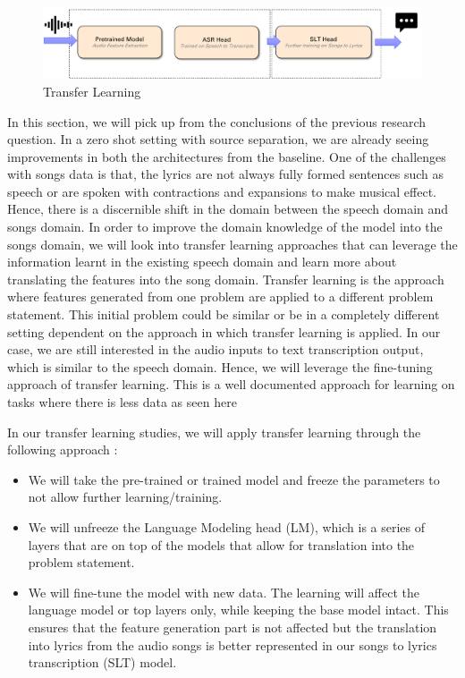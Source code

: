     \begin{figure} [H]
    \centering
    \includegraphics[width=1.0\textwidth]{05-research study/figures/transferlearning.pdf}
    \caption{Transfer Learning}
    \label{fig:transferlearning}
\end{figure}

In this section, we will pick up from the conclusions of the previous research question. In a zero shot setting with source separation, we are already seeing improvements in both the architectures from the baseline. One of the challenges with songs data is that, the lyrics are not always fully formed sentences such as speech or are spoken with contractions and expansions to make musical effect. Hence, there is a discernible shift in the domain between the speech domain and songs domain. In order to improve the domain knowledge of the model into the songs domain, we will look into transfer learning approaches that can leverage the information learnt in the existing speech domain and learn more about translating the features into the song domain.
Transfer learning is the approach where features generated from one problem are applied to a different problem statement. This initial problem could be similar or be in a completely different setting dependent on the approach in which transfer learning is applied. In our case, we are still interested in the audio inputs to text transcription output, which is similar to the speech domain. Hence, we will leverage the fine-tuning approach of transfer learning. This is a well documented approach for learning on tasks where there is less data as seen here \cite{buragohain2022deep} \cite{hosna2022transfer}


In our transfer learning studies, we will apply transfer learning through the following approach :
\begin{itemize}
    \item We will take the pre-trained or trained model and freeze the parameters to not allow further learning/training.
    \item We will unfreeze the Language Modeling head (LM), which is a series of layers that are on top of the models that allow for translation into the problem statement.
    \item We will fine-tune the model with new data. The learning will affect the language model or top layers only, while keeping the base model intact. This ensures that the feature generation part is not affected but the translation into lyrics from the audio songs is better represented in our songs to lyrics transcription (SLT) model.
\end{itemize}

